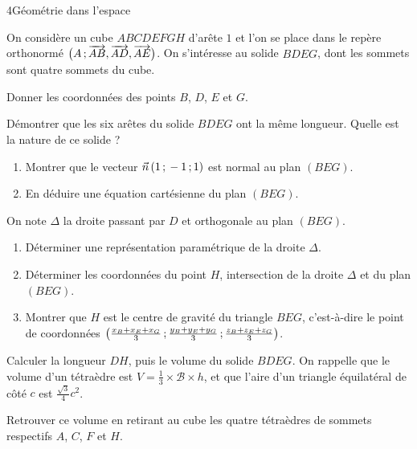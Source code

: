 \begin{exoBac}{4}{Géométrie dans l'espace}
\begin{codecote}[0.6]
On considère un cube $ABCDEFGH$ d'arête $1$ et l'on se place dans le repère orthonormé $\big(A\,{;}\,\overrightarrow{AB},\overrightarrow{AD},\overrightarrow{AE}\big)$.
On s'intéresse au solide $BDEG$, dont les sommets sont quatre sommets du cube.
\begin{questions}
  \item Donner les coordonnées des points $B$, $D$, $E$ et $G$.
  \item Démontrer que les six arêtes du solide $BDEG$ ont la même longueur. Quelle est la nature de ce solide ?
  \item \begin{enumerate}[label=\alph*),leftmargin=1.4em,itemsep=0.4mm,topsep=0.4mm]
      \item Montrer que le vecteur $\vec n\,(1\,{;}\,-1\,{;}\,1)$ est normal au plan $(BEG)$.
      \item En déduire une équation cartésienne du plan $(BEG)$.
    \end{enumerate}
\end{questions}
\cote
\centering
{}
\end{codecote}
\begin{questions}[start=4]
  \item On note $\Delta$ la droite passant par $D$ et orthogonale au plan $(BEG)$.
    \begin{enumerate}[label=\alph*),leftmargin=1.4em,itemsep=0.4mm,topsep=0.4mm]
      \item Déterminer une représentation paramétrique de la droite $\Delta$.
      \item Déterminer les coordonnées du point $H$, intersection de la droite $\Delta$ et du plan $(BEG)$.
      \item Montrer que $H$ est le centre de gravité du triangle $BEG$, c'est-à-dire le point de coordonnées
        $\left(\frac{x_B+x_E+x_G}{3}\,{;}\,\frac{y_B+y_E+y_G}{3}\,{;}\,\frac{z_B+z_E+z_G}{3}\right)$.
    \end{enumerate}
  \item Calculer la longueur $DH$, puis le volume du solide $BDEG$. On rappelle que le volume d'un tétraèdre est
    $V=\frac13\times\mathcal{B}\times h$, et que l'aire d'un triangle équilatéral de côté $c$ est $\frac{\sqrt3}{4}c^2$.
  \item Retrouver ce volume en retirant au cube les quatre tétraèdres de sommets respectifs $A$, $C$, $F$ et $H$.
\end{questions}
\end{exoBac}

